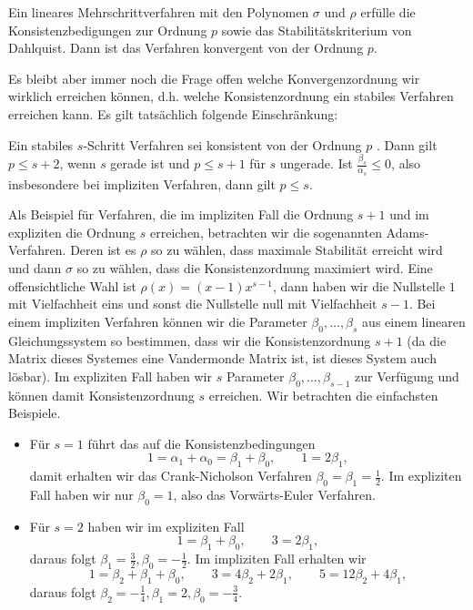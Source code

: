 \begin{theorem}{}{}
Ein lineares Mehrschrittverfahren mit den Polynomen $\sigma$ und $\rho$ erfülle die Konsistenzbedigungen zur Ordnung $p$ sowie das Stabilitätskriterium von Dahlquist. Dann ist das Verfahren konvergent von der Ordnung $p$.
\end{theorem}

Es bleibt aber immer noch die Frage offen welche Konvergenzordnung wir wirklich erreichen können, d.h. welche Konsistenzordnung ein stabiles Verfahren erreichen kann. Es gilt tatsächlich folgende Einschränkung:

\begin{theorem}{}{}
Ein stabiles $s$-Schritt Verfahren sei konsistent von der Ordnung $p$ . Dann gilt $p\leq s+2$, wenn $s$ gerade ist und $p \leq s+1$ für $s$ ungerade. Ist $\frac{\beta_s}{\alpha_s} \leq 0$, also insbesondere bei impliziten Verfahren, dann gilt $p\leq s$.
\end{theorem}

Als Beispiel für Verfahren, die im impliziten Fall die Ordnung $s+1$ und im expliziten die Ordnung $s$ erreichen, betrachten wir die sogenannten Adams-Verfahren. Deren ist es $\rho$ so zu wählen, dass maximale Stabilität erreicht wird und dann $\sigma$ so zu wählen, dass die Konsistenzordnung maximiert wird. Eine offensichtliche Wahl ist $\rho(x) = (x-1) x^{s-1}$, dann haben wir die Nullstelle $1$ mit Vielfachheit eins und sonst die Nullstelle null mit Vielfachheit $s-1$. Bei einem impliziten Verfahren können wir die Parameter $\beta_0,\ldots,\beta_s$ aus einem linearen Gleichungssystem so bestimmen, dass wir die Konsistenzordnung $s+1$ (da die Matrix dieses Systemes eine Vandermonde Matrix ist, ist dieses System auch lösbar). Im expliziten Fall haben wir $s$ Parameter $\beta_0, \ldots,\beta_{s-1}$ zur Verfügung und können damit Konsistenzordnung $s$ erreichen. Wir betrachten die einfachsten Beispiele.
%
\begin{itemize}
\item Für $s=1$ führt das auf die Konsistenzbedingungen
$$ 1 = \alpha_1 + \alpha_0 = \beta_1 + \beta_0, \qquad 1 = 2 \beta_1, $$
damit erhalten wir das Crank-Nicholson Verfahren $\beta_0 = \beta_1 = \frac{1}2$. Im expliziten Fall haben wir nur $\beta_0 =1$, also das Vorwärts-Euler Verfahren. 
%
\item Für $s=2$ haben wir im expliziten Fall
$$ 1 = \beta_1 + \beta_0, \qquad 3 = 2 \beta_1 , $$
daraus folgt $\beta_1 =  \frac{3}2, \beta_0 = -\frac{1}2$. Im impliziten Fall erhalten wir 
$$ 1 = \beta_2 + \beta_1 + \beta_0, \qquad 3 = 4 \beta_2 + 2 \beta_1, \qquad  5 = 12 \beta_2 + 4 \beta_1, $$
daraus folgt $\beta_2 = - \frac{1}4, \beta_1 = 2, \beta_0 = -\frac{3}4$.
\end{itemize}



